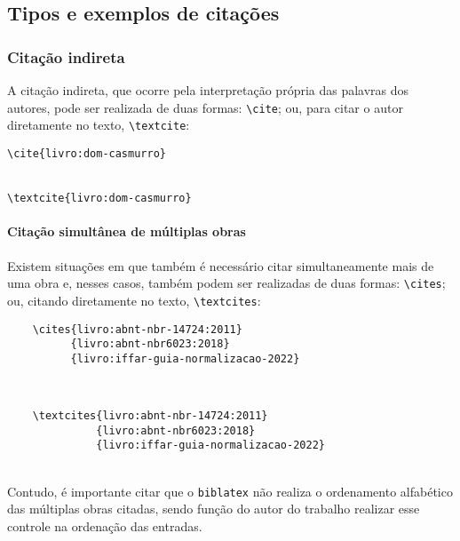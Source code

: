 \subsection{Tipos e exemplos de citações}
\subsubsection{Citação indireta}
A citação indireta, que ocorre pela interpretação própria das palavras dos autores, pode ser realizada de duas formas: \verb|\cite|; ou, para citar o autor diretamente no texto, \verb|\textcite|:

\verb|\cite{livro:dom-casmurro}|

\cite{livro:dom-casmurro}\\

\verb|\textcite{livro:dom-casmurro}|

\textcite{livro:dom-casmurro}

\paragraph{Citação simultânea de múltiplas obras}
Existem situações em que também é necessário citar simultaneamente mais de uma obra e, nesses casos, também podem ser realizadas de duas formas: \verb|\cites|; ou, citando diretamente no texto, \verb|\textcites|:

\begin{verbatim}
    \cites{livro:abnt-nbr-14724:2011}
          {livro:abnt-nbr6023:2018}
          {livro:iffar-guia-normalizacao-2022}
\end{verbatim}%
\cites{livro:abnt-nbr-14724:2011}{livro:abnt-nbr6023:2018}
{livro:iffar-guia-normalizacao-2022}\\

\begin{verbatim}
    \textcites{livro:abnt-nbr-14724:2011}
              {livro:abnt-nbr6023:2018}
              {livro:iffar-guia-normalizacao-2022}
\end{verbatim}%
\textcites{livro:abnt-nbr-14724:2011}{livro:abnt-nbr6023:2018}
{livro:iffar-guia-normalizacao-2022}\\

Contudo, é importante citar que o \verb|biblatex| não realiza o ordenamento alfabético das múltiplas obras citadas, sendo função do autor do trabalho realizar esse controle na ordenação das entradas.

